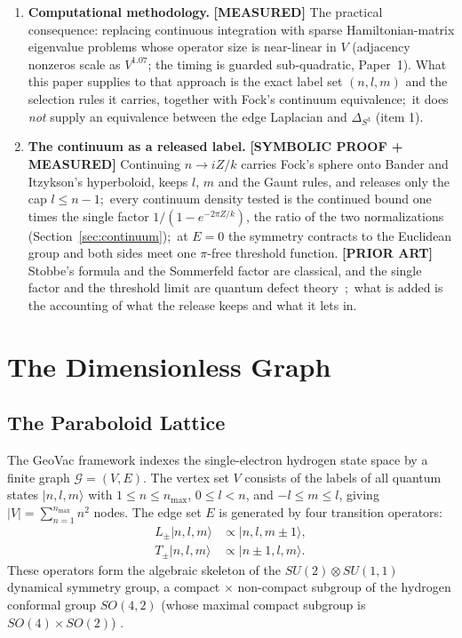 \documentclass[aps,pra,twocolumn,superscriptaddress,longbibliography]{revtex4-2}
\begin{document}
\begin{enumerate}
\item \textbf{Computational methodology.} \textbf{[MEASURED]} The practical consequence: replacing continuous integration with sparse Hamiltonian-matrix eigenvalue problems whose operator size is near-linear in $V$ (adjacency nonzeros scale as $V^{1.07}$; the timing is guarded sub-quadratic, Paper~1).  What this paper supplies to that approach is the exact label set $(n,l,m)$ and the selection rules it carries, together with Fock's continuum equivalence;\ it does \emph{not} supply an equivalence between the edge Laplacian and $\Delta_{S^3}$ (item 1).
\item \textbf{The continuum as a released label.} \textbf{[SYMBOLIC PROOF + MEASURED]} Continuing $n \to iZ/k$ carries Fock's sphere onto Bander and Itzykson's hyperboloid, keeps $l$, $m$ and the Gaunt rules, and releases only the cap $l \le n-1$;\ every continuum density tested is the continued bound one times the single factor $1/(1-e^{-2\pi Z/k})$, the ratio of the two normalizations (Section~\ref{sec:continuum});\ at $E = 0$ the symmetry contracts to the Euclidean group and both sides meet one $\pi$-free threshold function. \textbf{[PRIOR ART]} Stobbe's formula and the Sommerfeld factor are classical, and the single factor and the threshold limit are quantum defect theory~\cite{Seaton1983};\ what is added is the accounting of what the release keeps and what it lets in.
\end{enumerate}


\section{The Dimensionless Graph}
\label{sec:graph}

\subsection{The Paraboloid Lattice}

The GeoVac framework indexes the single-electron hydrogen state space by a finite graph $\mathcal{G} = (V, E)$. The vertex set $V$ consists of the labels of all quantum states $|n, l, m\rangle$ with $1 \leq n \leq n_{\max}$, $0 \leq l < n$, and $-l \leq m \leq l$, giving $|V| = \sum_{n=1}^{n_{\max}} n^2$ nodes. The edge set $E$ is generated by four transition operators:
\begin{align}
L_\pm |n, l, m\rangle &\propto |n, l, m \pm 1\rangle, \label{eq:angular}\\
T_\pm |n, l, m\rangle &\propto |n \pm 1, l, m\rangle. \label{eq:radial}
\end{align}
These operators form the algebraic skeleton of the $SU(2) \otimes SU(1,1)$ dynamical symmetry group, a compact$\,\times\,$non-compact subgroup of the hydrogen conformal group $SO(4,2)$ (whose maximal compact subgroup is $SO(4)\times SO(2)$) \cite{barut1967}.
\end{document}
